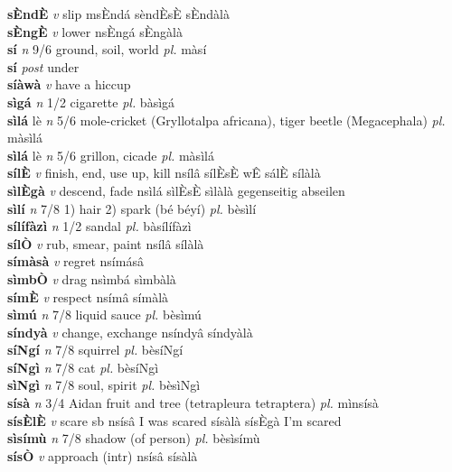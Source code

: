 \documentclass{article}
\begin{document}
{\bf sÈndÈ}  {\it v} slip   msÈndá  sèndÈsÈ sÈndàlà   \\ 
{\bf sÈngÈ}  {\it v} lower   nsÈngá   sÈngàlà   \\ 
{\bf sí}  {\it n} 9/6 ground, soil, world {\it pl.} màsí         \\ 
{\bf sí}  {\it post} under         \\ 
{\bf síàwà}  {\it v} have a hiccup         \\ 
{\bf sìgá}  {\it n} 1/2 cigarette {\it pl.} bàsìgá         \\ 
{\bf sìlá} lè {\it n} 5/6 mole-cricket (Gryllotalpa africana), tiger beetle (Megacephala) {\it pl.} màsìlá         \\ 
{\bf sìlá} lè {\it n} 5/6 grillon, cicade {\it pl.} màsìlá         \\ 
{\bf sílÈ}  {\it v} finish, end, use up, kill   nsílâ  sílÈsÈ wÊ sálÈ sílàlà   \\ 
{\bf sìlÈgà}  {\it v} descend, fade   nsìlá  sìlÈsÈ sìlàlà gegenseitig abseilen   \\ 
{\bf sìlí}  {\it n} 7/8 1) hair 2) spark (bé béyí) {\it pl.} bèsìlí         \\ 
{\bf sílífàzì}  {\it n} 1/2 sandal {\it pl.} bàsílífàzì         \\ 
{\bf sílÒ}  {\it v} rub, smear, paint   nsílâ   sílàlà   \\ 
{\bf símàsà}  {\it v} regret   nsímásâ      \\ 
{\bf sìmbÒ}  {\it v} drag   nsìmbá   sìmbàlà   \\ 
{\bf símÈ}  {\it v} respect   nsímâ   símàlà   \\ 
{\bf sìmú}  {\it n} 7/8 liquid sauce {\it pl.} bèsìmú         \\ 
{\bf síndyà}  {\it v} change, exchange   nsíndyâ   síndyàlà   \\ 
{\bf síNgí}  {\it n} 7/8 squirrel {\it pl.} bèsíNgí         \\ 
{\bf síNgì}  {\it n} 7/8 cat {\it pl.} bèsíNgì         \\ 
{\bf sìNgì}  {\it n} 7/8 soul, spirit {\it pl.} bèsìNgì         \\ 
{\bf sísà}  {\it n} 3/4 Aidan fruit and tree (tetrapleura tetraptera) {\it pl.} mìnsísà         \\ 
{\bf sísÈlÈ}  {\it v} scare sb   nsísâ I was scared   sísàlà sísÈgà I'm scared  \\ 
{\bf sìsímù}  {\it n} 7/8 shadow (of  person) {\it pl.} bèsìsímù         \\ 
{\bf sísÒ}  {\it v} approach (intr)   nsísâ   sísàlà   \\ 
\end{document}
